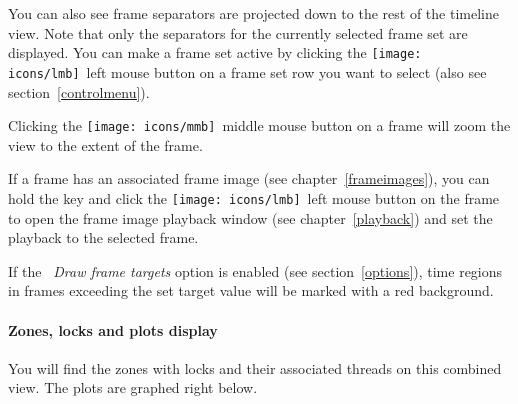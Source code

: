 \documentclass[hidelinks,titlepage,a4paper,twoside]{article}
\newcommand{\LMB}{\texttt{[image: icons/lmb]}}
\newcommand{\MMB}{\texttt{[image: icons/mmb]}}
\begin{document}
You can also see frame separators are projected down to the rest of the timeline view. Note that only the separators for the currently selected frame set are displayed. You can make a frame set active by clicking the \LMB{}~left mouse button on a frame set row you want to select (also see section~\ref{controlmenu}).

Clicking the \MMB{}~middle mouse button on a frame will zoom the view to the extent of the frame.

If a frame has an associated frame image (see chapter~\ref{frameimages}), you can hold the \keys{\ctrl} key and click the \LMB{}~left mouse button on the frame to open the frame image playback window (see chapter~\ref{playback}) and set the playback to the selected frame.

If the \emph{\faFlagCheckered{}~Draw frame targets} option is enabled (see section~\ref{options}), time regions in frames exceeding the set target value will be marked with a red background.

\paragraph{Zones, locks and plots display}
\label{zoneslocksplots}

You will find the zones with locks and their associated threads on this combined view. The plots are graphed right below.
\end{document}
